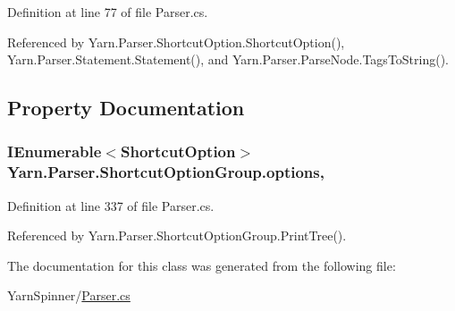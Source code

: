 Definition at line 77 of file Parser.\-cs.



Referenced by Yarn.\-Parser.\-Shortcut\-Option.\-Shortcut\-Option(), Yarn.\-Parser.\-Statement.\-Statement(), and Yarn.\-Parser.\-Parse\-Node.\-Tags\-To\-String().



\subsection{Property Documentation}
\hypertarget{a00160_a91b28e9dce684c476c526c4103b6c488}{
\subsubsection[{options}]{\setlength{\rightskip}{0pt plus 5cm}I\-Enumerable$<${\bf Shortcut\-Option}$>$ Yarn.\-Parser.\-Shortcut\-Option\-Group.\-options\hspace{0.3cm}{\ttfamily [get]}, {\ttfamily [package]}}}\label{a00160_a91b28e9dce684c476c526c4103b6c488}


Definition at line 337 of file Parser.\-cs.



Referenced by Yarn.\-Parser.\-Shortcut\-Option\-Group.\-Print\-Tree().



The documentation for this class was generated from the following file\-:\begin{DoxyCompactItemize}
\item 
Yarn\-Spinner/\hyperlink{a00313}{Parser.\-cs}\end{DoxyCompactItemize}
